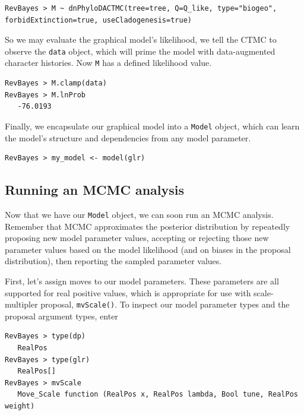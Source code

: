 \documentclass[11pt]{article}
\begin{document}
\begin{snugshade}
\begin{lstlisting}
RevBayes > M ~ dnPhyloDACTMC(tree=tree, Q=Q_like, type="biogeo", forbidExtinction=true, useCladogenesis=true)
\end{lstlisting}
\end{snugshade}

So we may evaluate the graphical model's likelihood, we tell the CTMC to observe the {\tt data} object, which will prime the model with data-augmented character histories.
Now {\tt M} has a defined likelihood value.
\begin{snugshade}
\begin{lstlisting}
RevBayes > M.clamp(data)
RevBayes > M.lnProb
   -76.0193
\end{lstlisting}
\end{snugshade}

Finally, we encapsulate our graphical model into a {\tt Model} object, which can learn the model's structure and dependencies from any model parameter.
\begin{snugshade}
\begin{lstlisting}
RevBayes > my_model <- model(glr)
\end{lstlisting}
\end{snugshade}

\subsection{Running an MCMC analysis}

Now that we have our {\tt Model} object, we can soon run an MCMC analysis.
Remember that MCMC approximates the posterior distribution by repeatedly proposing new model parameter values, accepting or rejecting those new parameter values based on the model likelihood (and on biases in the proposal distribution), then reporting the sampled parameter values.

First, let's assign moves to our model parameters.
These parameters are all supported for real positive values, which is appropriate for use with scale-multipler proposal, {\tt mvScale()}.
To inspect our model parameter types and the proposal argument types, enter

\begin{snugshade}
\begin{lstlisting}
RevBayes > type(dp)
   RealPos
RevBayes > type(glr)
   RealPos[]
RevBayes > mvScale
   Move_Scale function (RealPos x, RealPos lambda, Bool tune, RealPos weight)
\end{lstlisting}
\end{snugshade}
\end{document}
